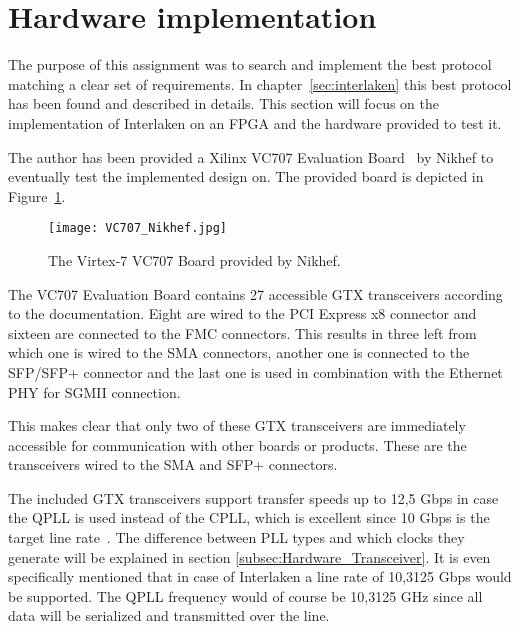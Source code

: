 \section{Hardware implementation}
\label{sec:hardware_implementation}

The purpose of this assignment was to search and implement the best protocol matching a clear set of requirements. In chapter~\ref{sec:interlaken} this best protocol has been found and described in details. This section will focus on the implementation of Interlaken on an FPGA and the hardware provided to test it.

The author has been provided a Xilinx VC707 Evaluation Board~\cite{VC707} by Nikhef to eventually test the implemented design on.
The provided board is depicted in Figure~\ref{Fig:VC707_Nikhef}.

\begin{figure}[H]
	\centering
	\texttt{[image: VC707\_Nikhef.jpg]}	
	\caption{The Virtex-7 VC707 Board provided by Nikhef.}
	\label{Fig:VC707_Nikhef}
\end{figure}


The VC707 Evaluation Board contains 27 accessible GTX transceivers according to the documentation. Eight are wired to the PCI Express x8 connector and sixteen are connected to the FMC connectors. This results in three left from which one is wired to the SMA connectors, another one is connected to the SFP/SFP+ connector and the last one is used in combination with the Ethernet PHY for SGMII connection.

This makes clear that only two of these GTX transceivers are immediately accessible for communication with other boards or products. These are the transceivers wired to the SMA and SFP+ connectors. 

The included GTX transceivers support transfer speeds up to 12,5 Gbps in case the QPLL is used instead of the CPLL, which is excellent since 10 Gbps is the target line rate~\cite{GTXT}. The difference between PLL types and which clocks they generate will be explained in section \ref{subsec:Hardware_Transceiver}. It is even specifically mentioned that in case of Interlaken a line rate of 10,3125 Gbps would be supported. The QPLL frequency would of course be 10,3125 GHz since all data will be serialized and transmitted over the line.

